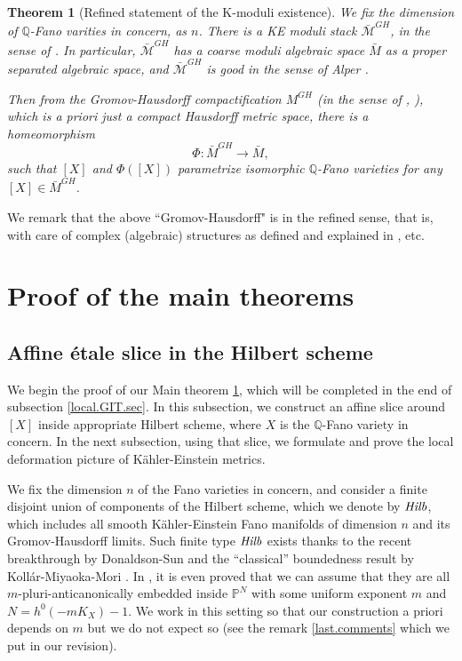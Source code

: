 \documentclass[12pt]{amsart}
\newtheorem{Thm}{Theorem}[section]
\theoremstyle{remark}
\theoremstyle{definition}
\begin{document}
\begin{Thm}[Refined statement of the K-moduli existence]\label{Main.thm}
We fix the dimension of $\mathbb{Q}$-Fano varities in concern, as $n$. 
There is a KE moduli stack $\bar{\mathcal{M}}^{GH}$, in the sense of \cite{OSS}. 
In particular, $\bar{\mathcal{M}}^{GH}$ has a coarse moduli algebraic space 
$\bar{M}$ as a proper separated algebraic space, and $\bar{\mathcal{M}}^{GH}$ is 
good in the sense of Alper \cite{Alp}. 

Then from the Gromov-Hausdorff compactification $M^{GH}
$ (in the sense of \cite{DS}, \cite{OSS}), which is a priori just a compact Hausdorff metric space, there is a homeomorphism $$\Phi\colon \bar{M}^{GH} \rightarrow \bar{M},$$ such that $[X]$ and $\Phi([X])$ parametrize isomorphic $\mathbb{Q}$-Fano varieties 
for any $[X]\in \bar{M}^{GH}$. 
\end{Thm}

\noindent
We remark that the above ``Gromov-Hausdorff" is in the refined sense, that is, 
with care of complex (algebraic) structures as defined and explained in \cite{DS}, \cite{SSY} etc. 

\section{Proof of the main theorems} 

\subsection{Affine \'{e}tale slice in the Hilbert scheme}\label{slice.sec}

We begin the proof of our Main theorem \ref{Main.thm}, 
which will be completed in the end of subsection \ref{local.GIT.sec}. 
In this subsection, we construct an affine slice around $[X]$ inside appropriate Hilbert scheme, 
where $X$ is the $\mathbb{Q}$-Fano variety in concern. In the next subsection, using that slice, 
we formulate and prove the local deformation picture of K\"ahler-Einstein metrics. 

We fix the dimension $n$ of the Fano varieties in concern, and 
consider a finite disjoint union of components of the Hilbert scheme, which we denote by 
${\it Hilb}$, which includes all smooth 
K\"ahler-Einstein Fano manifolds of dimension $n$ and its 
Gromov-Hausdorff limits. Such finite type ${\it Hilb}$ 
exists thanks to the recent breakthrough by 
Donaldson-Sun \cite{DS} and the ``classical'' boundedness result 
by Koll\'ar-Miyaoka-Mori \cite{KMM}. 
In \cite{DS}, it is even proved that 
we can assume that they are all $m$-pluri-anticanonically embedded inside 
$\mathbb{P}^{N}$ with some uniform exponent $m$ and $N=h^{0}(-mK_{X})-1$. 
We work in this setting so that our construction a priori depends on $m$ but we do not 
expect so (see the remark \ref{last.comments} which we put in our revision). 
\end{document}
